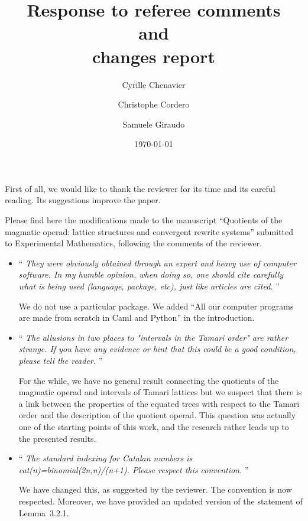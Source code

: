 \documentclass[11pt,reqno]{amsart}
\title[Response to Referees]
    {Response to referee comments \\
    and \\
    changes report}
\date{\today}
\author{Cyrille Chenavier \and Christophe Cordero \and Samuele Giraudo}
\numberwithin{equation}{subsection}
\begin{document}
\maketitle

First of all, we would like to thank the reviewer for its time and its
careful reading. Its suggestions improve the paper.
\medbreak

Please find here the modifications made to the manuscript
``Quotients of the magmatic operad: lattice structures and convergent
rewrite systems'' submitted to Experimental Mathematics, following
the comments of the reviewer.
\bigbreak

\begin{itemize}

\item `` {\it
They were obviously obtained through an expert and
heavy use of computer software.
In my humble opinion, when doing so, one should cite carefully what
is being used (language, package, etc), just like articles are cited.
}''
\smallbreak

We do not use a particular package. We added
``All our computer programs are made from scratch in {\sc Caml}
and {\sc Python}'' in the introduction.
\medbreak

\item `` {\it
The allusions in two places to "intervals in the Tamari order" are
rather strange. If you have any evidence or hint that this could be a
good condition, please tell the reader.
}''
\smallbreak

For the while, we have no general result connecting the quotients of
the magmatic operad and intervals of Tamari lattices but we suspect
that there is a link between the properties of the equated trees
with respect to the Tamari order and the description of the quotient
operad. This question was actually one of the starting points of this
work, and the research rather leads up to the presented results.
\medbreak

\item `` {\it
The standard indexing for Catalan numbers is
cat(n)=binomial(2n,n)/(n+1). Please respect this convention.
}''
\smallbreak

We have changed this, as suggested by the reviewer. The convention is
now respected. Moreover, we have provided an updated version of
the statement of Lemma~3.2.1.
\medbreak


\end{itemize}
\end{document}
